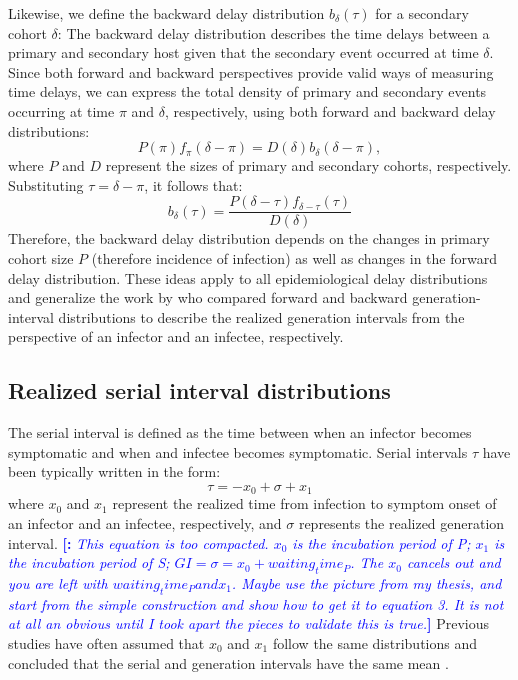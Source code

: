 \documentclass[12pt]{article}
\newcommand{\comment}{\showcomment}
\newcommand{\showcomment}[3]{\textcolor{#1}{\textbf{[#2: }\textsl{#3}\textbf{]}}}
\newcommand{\jd}[1]{\comment{cyan}{JD}{#1}}
\newcommand{\mli}[1]{\comment{blue}{}{#1}}
\begin{document}
Likewise, we define the backward delay distribution $b_\delta(\tau)$ for a secondary cohort $\delta$:
The backward delay distribution describes the time delays between a primary and secondary host given that the secondary event occurred at time $\delta$.
Since both forward and backward perspectives provide valid ways of measuring time delays, we can express the total density of primary and secondary events occurring at time $\pi$ and $\delta$, respectively, using both forward and backward delay distributions:
\begin{equation}
P(\pi) f_\pi(\delta-\pi) = D(\delta) b_\delta(\delta-\pi),
\end{equation}
where $P$ and $D$ represent the sizes of primary and secondary cohorts, respectively.
Substituting $\tau = \delta - \pi$, it follows that:
\begin{equation}
b_\delta(\tau) = \frac{P(\delta-\tau) f_{\delta-\tau}(\tau)}{D(\delta)}
\end{equation}
Therefore, the backward delay distribution depends on the changes in primary cohort size $P$ (therefore incidence of infection) as well as changes in the forward delay distribution.
These ideas apply to all epidemiological delay distributions and generalize the work by \citep{champredon2015intrinsic} who compared forward and backward generation-interval distributions to describe the realized generation intervals from the perspective of an infector and an infectee, respectively.

\subsection{Realized serial interval distributions}

The serial interval is defined as the time between when an infector becomes symptomatic and when and infectee becomes symptomatic.
Serial intervals $\tau$ have been typically written in the form:
\begin{equation}
\tau = - x_0 + \sigma + x_1
\end{equation}
where $x_0$ and $x_1$ represent the realized time from infection to symptom onset of an infector and an infectee, respectively, and $\sigma$ represents the realized generation interval.
\mli{This equation is too compacted. $x_0$ is the incubation period of P; $x_1$ is the incubation period of S; $GI = \sigma = x_0 + waiting_time_P$. The $x_0$ cancels out and you are left with $waiting_time_P and x_1$. Maybe use the picture from my thesis, and start from the simple construction and show how to get it to equation 3. It is not at all an obvious until I took apart the pieces to validate this is true.}
Previous studies have often assumed that $x_0$ and $x_1$ follow the same distributions and concluded that the serial and generation intervals have the same mean \citep{svensson2007note,klinkenberg2011correlation,champredon2018equivalence, britton2019estimation}.
\end{document}
